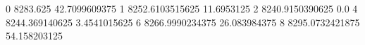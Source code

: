 0 8283.625 42.7099609375
1 8252.6103515625 11.6953125
2 8240.9150390625 0.0
4 8244.369140625 3.4541015625
6 8266.9990234375 26.083984375
8 8295.0732421875 54.158203125
